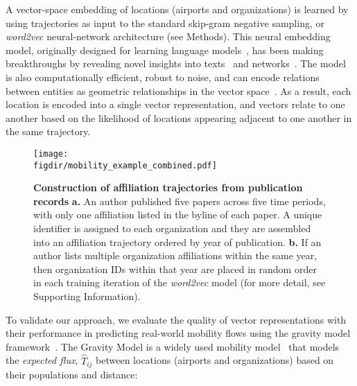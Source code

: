 \documentclass[12pt]{article} %
\def\figdir{../Figs}
\def\SI{Supporting Information}
\begin{document}
A vector-space embedding of locations (airports and organizations) is learned by using trajectories as input to the standard skip-gram negative sampling, or \textit{word2vec} neural-network architecture (see Methods).
This neural embedding model, originally designed for learning language models~\autocite{mikolov2013word2vec}, has been making breakthroughs by revealing novel insights into texts~\autocite{linzhuo2020hyperbolic, tshitoyan2019mat2vec, garg2018gender, kozlowski2018geometry, hamilton2016diachronic, le2014doc2vec, nakandala2017gendered} and networks~\autocite{perozzi2014deepwalk, grover2016node2vec}.
The model is also computationally efficient, robust to noise, and can encode relations between entities as geometric relationships in the vector space~\autocite{levy2014neural, nakandala2017gendered, kozlowski2018geometry, an2018semaxis}.
As a result, each location is encoded into a single vector representation, and vectors relate to one another based on the likelihood of locations appearing adjacent to one another in the same trajectory.

 
%
%
\begin{figure}[ht!]
    \centering
    \texttt{[image: \\figdir/mobility\_example\_combined.pdf]}
    \caption{
        \textbf{Construction of affiliation trajectories from publication records}
        \textbf{a.}
        An author published five papers across five time periods, with only one affiliation listed in the byline of each paper.
        A unique identifier is assigned to each organization and they are assembled into an affiliation trajectory ordered by year of publication.
        \textbf{b.}
        If an author lists multiple organization affiliations within the same year, then organization IDs within that year are placed in random order in each training iteration of the \textit{word2vec} model (for more detail, see \SI).
    }
    \label{fig:methods:mobility_sentence}
\end{figure}


To validate our approach, we evaluate the quality of vector representations with their performance in predicting real-world mobility flows using the gravity model framework~\autocite{zipf1946gravity, barbosa2018human}.
The Gravity Model is a widely used mobility model~\autocite{curiel2018citygravity, lewer2008immigrationgravity, jung2008highwaygravity, hong2016busgravity, truscott2012epidemicgravity, xia2005measlesgravity} that models the \textit{expected flux}, $\hat{T}_{ij}$ between locations (airports and organizations) based on their populations and distance:
\end{document}
